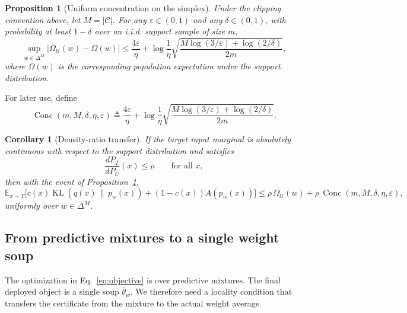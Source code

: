 \documentclass{article}
\newtheorem{proposition}{Proposition}
\newtheorem{corollary}{Corollary}
\newcommand{\EE}{\mathbb{E}}
\newcommand{\cC}{\mathcal{C}}
\newcommand{\cU}{\mathcal{U}}
\newcommand{\KL}{\operatorname{KL}}
\newcommand{\iid}{i.i.d.}
\newcommand{\simplex}{\Delta}
\begin{document}
\begin{proposition}[Uniform concentration on the simplex]
\label{prop:concentration}
Under the clipping convention above, let $M = |\cC|$. For any $\varepsilon \in (0,1)$ and any $\delta\in(0,1)$, with probability at least $1-\delta$ over an \iid{} support sample of size $m$,
\begin{equation}
    \sup_{w\in\simplex^{M}}
    \left|
        \Omega_{\cU}(w) - \Omega(w)
    \right|
    \le
    \frac{4\varepsilon}{\eta}
    +
    \log\!\frac{1}{\eta}
    \sqrt{
        \frac{
            M\log(3/\varepsilon)+\log(2/\delta)
        }{
            2m
        }
    },
    \label{eq:uniform_conc}
\end{equation}
where $\Omega(w)$ is the corresponding population expectation under the support distribution.
\end{proposition}

For later use, define
\[
    \operatorname{Conc}(m,M,\delta,\eta,\varepsilon)
    \triangleq
    \frac{4\varepsilon}{\eta}
    +
    \log\!\frac{1}{\eta}
    \sqrt{
        \frac{
            M\log(3/\varepsilon)+\log(2/\delta)
        }{
            2m
        }
    }.
\]

\begin{corollary}[Density-ratio transfer]
\label{cor:density}
If the target input marginal is absolutely continuous with respect to the support distribution and satisfies
\[
    \frac{dP_T}{dP_U}(x) \le \rho
    \qquad
    \text{for all } x,
\]
then with the event of Proposition~\ref{prop:concentration},
\begin{equation}
    \EE_{x\sim T}
    \Big[
        c(x)\KL(q(x)\,\|\,p_w(x))
        +
        (1-c(x))A(p_w(x))
    \Big]
    \le
    \rho\,
    \Omega_{\cU}(w)
    +
    \rho\,
    \operatorname{Conc}(m,M,\delta,\eta,\varepsilon),
    \label{eq:density_transfer}
\end{equation}
uniformly over $w\in\simplex^M$.
\end{corollary}

\subsection{From predictive mixtures to a single weight soup}

The optimization in Eq.~\eqref{eq:objective} is over predictive mixtures. The final deployed object is a single soup $\bar\theta_w$. We therefore need a locality condition that transfers the certificate from the mixture to the actual weight average.
\end{document}
